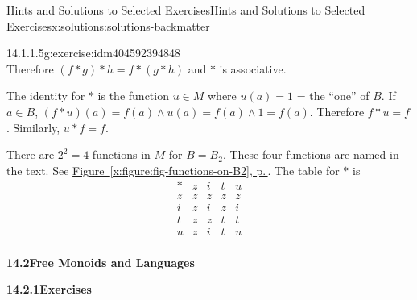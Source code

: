 \documentclass[twoside,10pt,]{book}
\newcommand{\blocktitlefont}{\relax}
\newcommand{\xreffont}{\relax}
\numberwithin{equation}{section}
\begin{document}
\begin{solutions-chapter}{Hints and Solutions to Selected Exercises}{}{Hints and Solutions to Selected Exercises}{}{}{x:solutions:solutions-backmatter}
\begin{divisionsolution}{14.1.1.5}{}{g:exercise:idm404592394848}
\begin{equation*}
\end{equation*}
Therefore \((f * g) * h =f * (g * h)\) and  \(*\) is  associative.%
\par
The identity for \(*\) is the function \(u \in  M\) where \(u(a) = 1\) = the ``one'' of \(B\). If \(a \in  B\), \((f*u)(a) =f(a)\land u(a) = f(a)\land 1 = f(a)\). Therefore \(f * u = f\). Similarly, \(u * f =f\).%
\par
There are \(2^2= 4\) functions in \(M\) for \(B = B _2\). These four functions are named in the text. See \hyperref[x:figure:fig-functions-on-B2]{Figure~{\xreffont\ref{x:figure:fig-functions-on-B2}}, p.\,\pageref{x:figure:fig-functions-on-B2}}. The table for \(*\) is%
\begin{equation*}
\begin{array}{c|cccc}
* &  z &  i & t &  u\\
\hline
z &z & z & z & z \\
i &z & i & z & i \\
t &z & z & t & t \\
u &z & i & t & u \\
\end{array}
\end{equation*}
%
\end{divisionsolution}%
\par\smallskip
\noindent\textbf{\Large{}14.2\space\textperiodcentered\space{}Free Monoids and Languages}
\par\smallskip
\par\smallskip
\noindent\textbf{\Large{}14.2.1\space\textperiodcentered\space{}Exercises}
\par\smallskip
{}%
\end{solutions-chapter}
\end{document}
